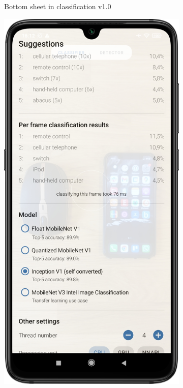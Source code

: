 \documentclass[
			   fontsize=11pt,
               paper=a4,
               bibliography=totoc,
               idxtotoc,
               headsepline,
               footsepline,
               footinclude=false,
               BCOR=12mm,
               DIV=13,
               openany,   %
               ]
               {scrbook}
\begin{document}
\begin{figure}[H]
\begin{subfigure}{.23\textwidth}
		\caption[Screenshots of the previous app in version 1.0 showing the classification activity with its bottom sheet expanded]{Bottom sheet in classification v1.0}
		\label{fig:appImage21}
	\end{subfigure}
	\hfil
	\begin{subfigure}{.23\textwidth}
		\centering
		\includegraphics[width=\linewidth]{figures/app_class_sheet_new.png}

\end{subfigure}
\end{figure}
\end{document}
